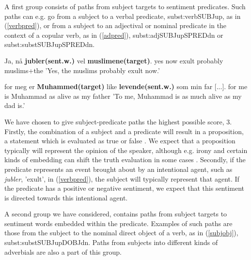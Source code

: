 \documentclass[11pt]{article}
\begin{document}
A first group consists of paths from subject targets to sentiment predicates. Such paths can e.g. go from a subject to a verbal predicate, subst:verb{\textunderscore}{\textunderscore}SUBJ{\textunderscore}up, as in (\ref{verbpred}), or from a subject to an adjectival or nominal predicate in the context of a copular verb, as in (\ref{adpred}), subst:adj{\textunderscore}{\textunderscore}SUBJ{\textunderscore}up{\textunderscore}{\textunderscore}SPRED{\textunderscore}dn or subst:subst{\textunderscore}{\textunderscore}SUBJ{\textunderscore}up{\textunderscore}{\textunderscore}SPRED{\textunderscore}dn.

\begin{examples}
\item\label{verbpred}
\gll Ja, n{\aa} \textbf{jubler(sent.w.)} vel \textbf{muslimene(target)}.
yes now exult probably muslims+the
\glt 'Yes, the muslims probably exult now.'
\glend

\item\label{adpred}
\gll [...] for meg er \textbf{Muhammed(target)} like \textbf{levende(sent.w.)} som min far [...].
{} for me is Muhammad as alive as my father {}
\glt 'To me, Muhammad is as much alive as my dad is.'
\glend

\end{examples}

We have chosen to give subject-predicate paths the highest possible score, 3. Firstly, the combination of a subject and a predicate will result in a proposition, a statement which is evaluated as true or false \cite{Heim98}. We expect that a proposition typically will represent the opinion of the speaker, although e.g. irony and certain kinds of embedding can shift the truth evaluation in some cases \cite{Hooper73}. Secondly, if the predicate represents an event brought about by an intentional agent, such as \emph{jubler}, 'exult', in (\ref{verbpred}), the subject will typically represent that agent. If the predicate has a positive or negative sentiment, we expect that this sentiment is directed towards this intentional agent. 

A second group we have considered, contains paths from subject targets to sentiment words embedded within the predicate. Examples of such paths are those from the subject to the nominal direct object of a verb, as in (\ref{subjobj}), subst:subst{\textunderscore}{\textunderscore}SUBJ{\textunderscore}up{\textunderscore}{\textunderscore}DOBJ{\textunderscore}dn. Paths from subjects into different kinds of adverbials are also a part of this group.
\end{document}
